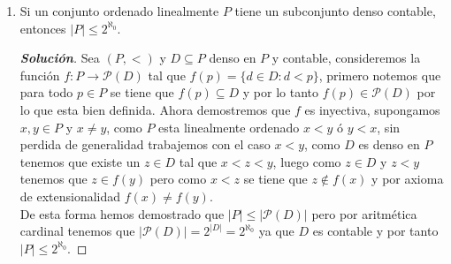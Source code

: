 \documentclass[11pt]{article}
\numberwithin{equation}{section}
\numberwithin{figure}{section}
\begin{document}
\begin{enumerate}
\begin{proof}[\textbf{Solución}]
   \begin{equation*}
       A_n=\bigcup\limits_{p(x)\in\mathcal{P}_n}A_n(p(x))
   \end{equation*}
   Note que esta es una unión contable de conjuntos finitos por lo tanto $A_n$ es contable. Denotemos $\mathbb{A}$ como el conjunto de números algebraicos y demostremos que:
   \begin{equation*}
       \mathbb{A}=\bigcup\limits_{n=1}^{\infty}A_n
   \end{equation*}
   Primero note que que todo elemento de cada $A_n$ es un numero algebraico por lo tanto es bastante evidente que cada $A_n\subseteq\mathbb{A}$ y por lo tanto $\bigcup\limits_{n=1}^{\infty}A_n\subseteq\mathbb{A}$.
   Tomemos $x_1\in\mathbb{A}$ por definición de número algebraico existe un polinomio de algún grado tal que $p(x)\in\mathcal{P}_n$ y $p(x_1)=0$ luego por definición del conjunto $x_1\in A_n(p(x))$ y por tanto $x_1\in A_n$. Luego como $\mathbb{A}$ es la unión contable de conjuntos contables quiere decir que es contable, es decir $|\mathbb{A}|=|\mathbb{N}|$.\\
   Por ultimo recordemos que $\mathbb{A}\subseteq\mathbb{R}$ y además $|\mathbb{R}|=2^{\aleph_0}$ luego por un teorema mencionado en el libro se tiene que $|\mathbb{R}-\mathbb{A}|=2^{\aleph_0}$ y note que el conjunto definido por $\mathbb{R}-\mathbb{A}$ es el conjunto de los números trascendentales y de esta forma concluimos la demostración.
   \end{proof}
   \item Si un conjunto ordenado linealmente $P$ tiene un subconjunto denso contable, entonces $|P|\leq2^{\aleph_0}$.
   \begin{proof}[\textbf{Solución}]
   Sea $(P,<)$ y $D\subseteq P$ denso en $P$ y contable, consideremos la función $f:P\longrightarrow\mathcal{P}(D)$ tal que $f(p)=\{d\in D:d<p\}$, primero notemos que para todo $p\in P$ se tiene que $f(p)\subseteq D$ y por lo tanto $f(p)\in\mathcal{P}(D)$ por lo que esta bien definida. 
   Ahora demostremos que $f$ es inyectiva, supongamos $x,y\in P$ y $x\neq y$, como $P$ esta linealmente ordenado $x<y$ ó $y<x$, sin perdida de generalidad trabajemos con el caso $x<y$, como $D$ es denso en $P$ tenemos que existe un $z\in D$ tal que $x<z<y$, luego como $z\in D$ y $z<y$ tenemos que $z\in f(y)$ pero como $x<z$ se tiene que $z\notin f(x)$ y por axioma de extensionalidad $f(x)\neq f(y)$.\\
   De esta forma hemos demostrado que $|P|\leq|\mathcal{P}(D)|$ pero por aritmética cardinal tenemos que $|\mathcal{P}(D)|=2^{|D|}=2^{\aleph_0}$ ya que $D$ es contable y por tanto $|P|\leq2^{\aleph_0}$.

\end{proof}
\end{enumerate}
\end{document}
